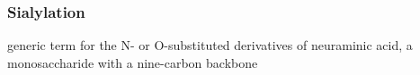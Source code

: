 \subsubsection {Sialylation}
 generic term for the N- or O-substituted derivatives of neuraminic acid, a monosaccharide with a nine-carbon backbone